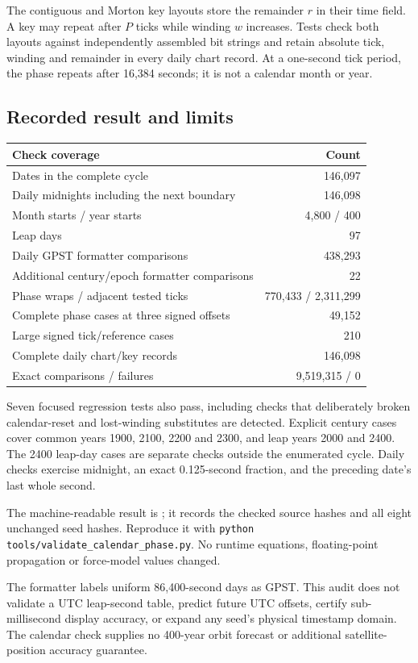 The contiguous and Morton key layouts store the remainder $r$ in their time
field. A key may repeat after $P$ ticks while winding $w$ increases. Tests check
both layouts against independently assembled bit strings and retain absolute
tick, winding and remainder in every daily chart record. At a one-second tick
period, the phase repeats after 16,384 seconds; it is not a calendar month or year.

\subsection{Recorded result and limits}
\begin{center}\begin{tabular}{@{}lr@{}}\toprule
Check coverage & Count\\\midrule
Dates in the complete cycle & 146,097\\
Daily midnights including the next boundary & 146,098\\
Month starts / year starts & 4,800 / 400\\
Leap days & 97\\
Daily GPST formatter comparisons & 438,293\\
Additional century/epoch formatter comparisons & 22\\
Phase wraps / adjacent tested ticks & 770,433 / 2,311,299\\
Complete phase cases at three signed offsets & 49,152\\
Large signed tick/reference cases & 210\\
Complete daily chart/key records & 146,098\\\midrule
Exact comparisons / failures & 9,519,315 / 0\\\bottomrule
\end{tabular}\end{center}

Seven focused regression tests also pass, including checks that deliberately
broken calendar-reset and lost-winding substitutes are detected. Explicit
century cases cover common years 1900, 2100, 2200 and 2300, and leap years 2000
and 2400. The 2400 leap-day cases are separate checks outside the enumerated
cycle. Daily checks exercise midnight, an exact 0.125-second fraction, and
the preceding date's last whole second.

The machine-readable result is
; it records the checked source
hashes and all eight unchanged seed hashes. Reproduce it with
\texttt{python tools/validate\_calendar\_phase.py}.
No runtime equations, floating-point propagation or force-model values changed.

\begin{panel}
The formatter labels uniform 86,400-second days as GPST. This audit does not
validate a UTC leap-second table, predict future UTC offsets, certify
sub-millisecond display accuracy, or expand any seed's physical timestamp
domain. The calendar check supplies no 400-year orbit forecast or additional
satellite-position accuracy guarantee.
\end{panel}

